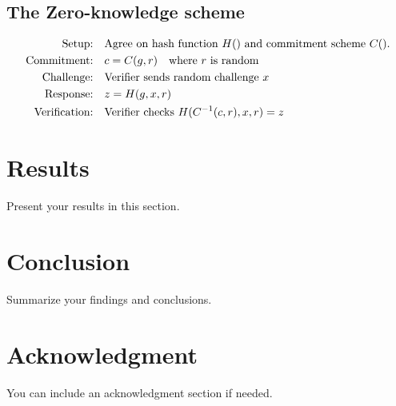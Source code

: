 \documentclass{article}
\begin{document}
\subsection{The Zero-knowledge scheme}
\begin{align}
  \text{Setup:} \quad & \text{Agree on hash function \( H() \) and commitment scheme \( C() \).} \label{eq:setup} \\
  \text{Commitment:} \quad & c = C(g, r) \quad \text{where \( r \) is random} \label{eq:commitment} \\
  \text{Challenge:} \quad & \text{Verifier sends random challenge \( x \)} \label{eq:challenge} \\
  \text{Response:} \quad & z = H(g, x, r) \label{eq:response} \\
  \text{Verification:} \quad & \text{Verifier checks } H(C^{-1}(c, r), x, r) = z \label{eq:verification}
\end{align}

\section{Results}
Present your results in this section.

\section{Conclusion}
Summarize your findings and conclusions.

\section*{Acknowledgment}
You can include an acknowledgment section if needed.



\end{document}
